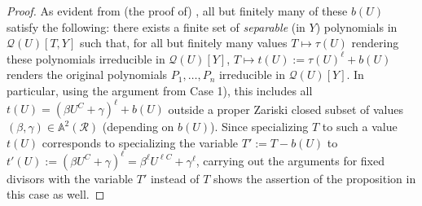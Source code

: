 \documentclass[11pt,a4paper,reqno]{amsart}
\theoremstyle{definition}
\begin{document}
\begin{proof}
As evident from (the proof of) \cite[Lemma 4.5]{BDN20b}, all but finitely many of these $b(U)$ satisfy the following: there exists a finite set of {\it separable} (in $Y$) polynomials in $\mathcal Q(U)[T,Y]$ such that, for all but finitely many values $T\mapsto \tau(U)$ rendering these polynomials irreducible in $\mathcal Q(U)[Y]$, $T\mapsto t(U):=\tau(U)^\ell + b(U)$ renders the original polynomials $P_1,\dots, P_n$ irreducible in $\mathcal Q(U)[Y]$. In particular, using the argument from Case 1), this includes all $t(U)= (\beta U^C + \gamma)^\ell + b(U)$ outside a proper Zariski closed subset of values $(\beta,\gamma)\in \mathbb{A}^2(\mathcal R)$ (depending on $b(U)$).  Since specializing $T$ to such a value $t(U)$ corresponds to specializing the variable $T':=T-b(U)$ to $t'(U):=(\beta U^C + \gamma)^\ell = \beta^\ell U^{\ell C} + \gamma^\ell$, carrying out the arguments for fixed divisors with the variable $T'$ instead of $T$ shows the assertion of the proposition in this case as well.
\end{proof}
\end{document}
